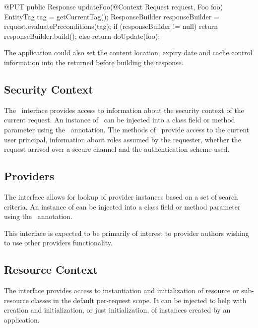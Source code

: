 \begin{listing}{1}
@PUT
public Response updateFoo(@Context Request request, Foo foo) {
	EntityTag tag = getCurrentTag();
	ResponseBuilder responseBuilder = request.evaluatePreconditions(tag);
	if (responseBuilder != null)
	  return responseBuilder.build();
	else
	  return doUpdate(foo);
}
\end{listing}


The application could also set the content location, expiry date and cache control information into the returned  before building the response.

\subsection{Security Context}
\label{security_context}

The \SecurityContext\ interface provides access to information about the security context of the current request. An instance of \SecurityContext\ can be injected into a class field or method parameter using the \Context\ annotation. The methods of \SecurityContext\ provide access to the current user principal, information about roles assumed by the requester, whether the request arrived over a secure channel and the authentication scheme used.

\subsection{Providers}
\label{providercontext}

The  interface allows for lookup of provider instances based on a set of search criteria. An instance of  can be injected into a class field or method parameter using the \Context\ annotation.

This interface is expected to be primarily of interest to provider authors wishing to use other providers functionality.

\subsection{Resource Context}
\label{resource_context}

The  interface provides access to instantiation and initialization of resource or sub-resource classes in the default per-request scope. It can be injected to help with creation and initialization, or just initialization, of instances created by an application.

